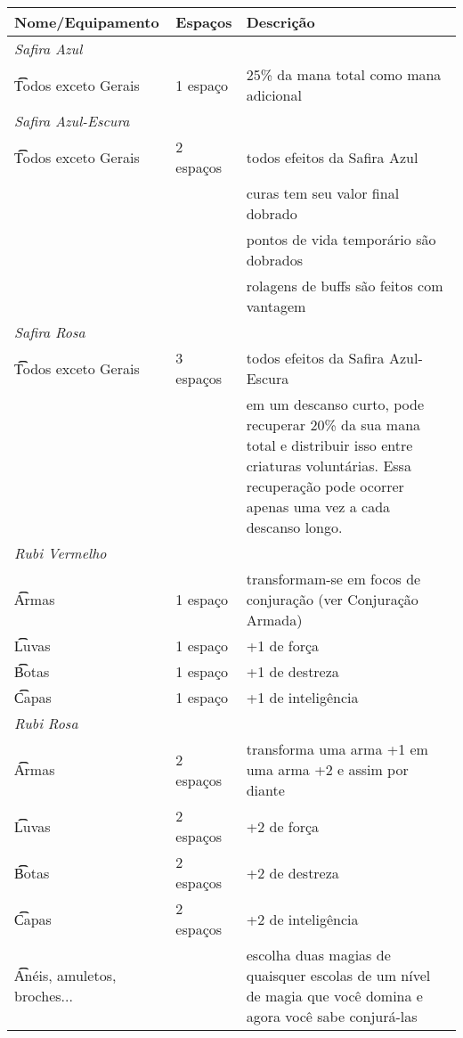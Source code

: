 \documentclass{RPG_Adventure}[2021/10/20]
\begin{document}
\begin{center}
\begin{longtable}{ m{6cm} m{2cm} m{8cm} }
    \textbf{Nome/Equipamento} & \textbf{Espaços} & \textbf{Descrição} \\

    \hline \hline \hline \hline

    \multicolumn{2}{l}{\t\textit{Safira Azul}} \\
    \t\t Todos exceto Gerais & 1 espaço & 25\% da mana total como mana adicional
    \\
    \hline \hline

    \multicolumn{2}{l}{\t\textit{Safira Azul-Escura}} \\
    \t\t Todos exceto Gerais & 2 espaços & todos efeitos da Safira Azul \\
    && curas tem seu valor final dobrado \\
    && pontos de vida temporário são dobrados \\
    && rolagens de buffs são feitos com vantagem \\
    \hline \hline

    \multicolumn{2}{l}{\t\textit{Safira Rosa}} \\
    \t\t Todos exceto Gerais & 3 espaços & todos efeitos da Safira Azul-Escura \\
    && em um descanso curto, pode recuperar 20\% da sua mana total e
    distribuir isso entre criaturas voluntárias. Essa recuperação pode
    ocorrer apenas uma vez a cada descanso longo. \\

    \hline \hline \hline \hline

    \multicolumn{2}{l}{\t\textit{Rubi Vermelho}} \\
    \t\t Armas & 1 espaço & transformam-se em focos de conjuração (ver
    Conjuração Armada) \\ \hline
    \t\t Luvas & 1 espaço & +1 de força \\ \hline
    \t\t Botas & 1 espaço & +1 de destreza \\ \hline
    \t\t Capas & 1 espaço & +1 de inteligência \\
    \hline \hline

    \multicolumn{2}{l}{\t\textit{Rubi Rosa}} \\
    \t\t Armas & 2 espaços & transforma uma arma +1 em uma arma +2 e assim por
    diante\\ \hline
    \t\t Luvas & 2 espaços & +2 de força \\ \hline
    \t\t Botas & 2 espaços & +2 de destreza \\ \hline
    \t\t Capas & 2 espaços & +2 de inteligência \\ \hline
    \t\t Anéis, amuletos, broches... && escolha duas magias de quaisquer
    escolas de um nível de magia que você domina e agora você sabe
    conjurá-las \\
    \hline \hline


\end{longtable}
\end{center}
\end{document}
